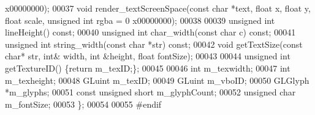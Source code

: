 \begin{DoxyCode}
      x00000000);
00037     \textcolor{keywordtype}{void} render\_textScreenSpace(\textcolor{keyword}{const} \textcolor{keywordtype}{char} *text, \textcolor{keywordtype}{float} x, \textcolor{keywordtype}{float} y, \textcolor{keywordtype}{float} scale, \textcolor{keywordtype}{unsigned} \textcolor{keywordtype}{int} rgba = 0
      x00000000);
00038 
00039     \textcolor{keywordtype}{unsigned} \textcolor{keywordtype}{int} lineHeight() \textcolor{keyword}{const};
00040     \textcolor{keywordtype}{unsigned} \textcolor{keywordtype}{int} char\_width(\textcolor{keyword}{const} \textcolor{keywordtype}{char} c) \textcolor{keyword}{const};
00041     \textcolor{keywordtype}{unsigned} \textcolor{keywordtype}{int} string\_width(\textcolor{keyword}{const} \textcolor{keywordtype}{char} *str) \textcolor{keyword}{const};
00042     \textcolor{keywordtype}{void} getTextSize(\textcolor{keyword}{const} \textcolor{keywordtype}{char}* str, \textcolor{keywordtype}{int}& width, \textcolor{keywordtype}{int} &height, \textcolor{keywordtype}{float} fontSize);
00043 
00044     \textcolor{keywordtype}{unsigned} \textcolor{keywordtype}{int} getTextureID() \{\textcolor{keywordflow}{return} m\_texID;\};
00045 
00046     \textcolor{keywordtype}{int} m_texwidth;
00047     \textcolor{keywordtype}{int} m_texheight;
00048     GLuint m_texID;
00049     GLuint m_vboID;
00050     GLGlyph *m_glyphs;
00051     \textcolor{keyword}{const} \textcolor{keywordtype}{unsigned} \textcolor{keywordtype}{short} m_glyphCount;
00052     \textcolor{keywordtype}{unsigned} \textcolor{keywordtype}{char} m_fontSize;
00053 \};
00054 
00055 \textcolor{preprocessor}{#endif}
\end{DoxyCode}
